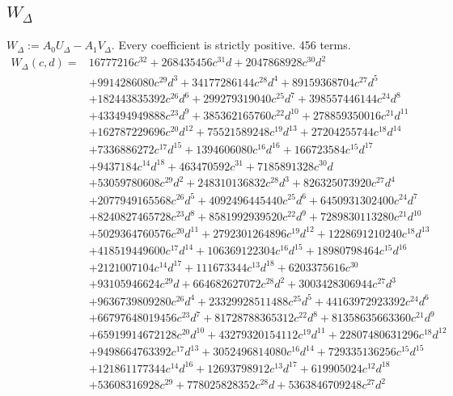 \subsection*{$W_\Delta$}
$W_\Delta:=A_0U_\Delta-A_1V_\Delta$. Every coefficient is strictly positive. 456 terms.
{\small
\begin{align*}
W_\Delta(c,d)={}&16777216c^{32}+268435456c^{31}d+2047868928c^{30}d^{2}\\
&+9914286080c^{29}d^{3}+34177286144c^{28}d^{4}+89159368704c^{27}d^{5}\\
&+182443835392c^{26}d^{6}+299279319040c^{25}d^{7}+398557446144c^{24}d^{8}\\
&+433494949888c^{23}d^{9}+385362165760c^{22}d^{10}+278859350016c^{21}d^{11}\\
&+162787229696c^{20}d^{12}+75521589248c^{19}d^{13}+27204255744c^{18}d^{14}\\
&+7336886272c^{17}d^{15}+1394606080c^{16}d^{16}+166723584c^{15}d^{17}\\
&+9437184c^{14}d^{18}+463470592c^{31}+7185891328c^{30}d\\
&+53059780608c^{29}d^{2}+248310136832c^{28}d^{3}+826325073920c^{27}d^{4}\\
&+2077949165568c^{26}d^{5}+4092496445440c^{25}d^{6}+6450931302400c^{24}d^{7}\\
&+8240827465728c^{23}d^{8}+8581992939520c^{22}d^{9}+7289830113280c^{21}d^{10}\\
&+5029364760576c^{20}d^{11}+2792301264896c^{19}d^{12}+1228691210240c^{18}d^{13}\\
&+418519449600c^{17}d^{14}+106369122304c^{16}d^{15}+18980798464c^{15}d^{16}\\
&+2121007104c^{14}d^{17}+111673344c^{13}d^{18}+6203375616c^{30}\\
&+93105946624c^{29}d+664682627072c^{28}d^{2}+3003428306944c^{27}d^{3}\\
&+9636739809280c^{26}d^{4}+23329928511488c^{25}d^{5}+44163972923392c^{24}d^{6}\\
&+66797648019456c^{23}d^{7}+81728788365312c^{22}d^{8}+81358635663360c^{21}d^{9}\\
&+65919914672128c^{20}d^{10}+43279320154112c^{19}d^{11}+22807480631296c^{18}d^{12}\\
&+9498664763392c^{17}d^{13}+3052496814080c^{16}d^{14}+729335136256c^{15}d^{15}\\
&+121861177344c^{14}d^{16}+12693798912c^{13}d^{17}+619905024c^{12}d^{18}\\
&+53608316928c^{29}+778025828352c^{28}d+5363846709248c^{27}d^{2}\\

\end{align*}}
